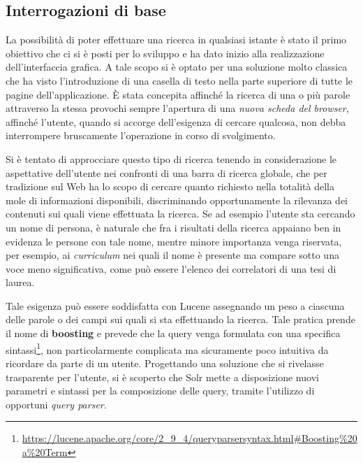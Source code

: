 \subsection{Interrogazioni di base}

La possibilità di poter effettuare una ricerca in qualsiasi istante è stato il primo obiettivo che ci si è posti per lo sviluppo e ha dato inizio alla realizzazione dell’interfaccia grafica. A tale scopo si è optato per una soluzione molto classica che ha visto l’introduzione di una casella di testo nella parte superiore di tutte le pagine dell’applicazione. È stata concepita affinché la ricerca di una o più parole attraverso la stessa provochi sempre l’apertura di una \textit{nuova scheda del browser}, affinché l’utente, quando si accorge dell’esigenza di cercare qualcosa, non debba interrompere bruscamente l’operazione in corso di svolgimento.

\vspace{1em}

Si è tentato di approcciare questo tipo di ricerca tenendo in considerazione le aspettative dell’utente nei confronti di una barra di ricerca globale, che per tradizione sul Web ha lo scopo di cercare quanto richiesto nella totalità della mole di informazioni disponibili, discriminando opportunamente la rilevanza dei contenuti sui quali viene effettuata la ricerca. Se ad esempio l’utente sta cercando un nome di persona, è naturale che fra i risultati della ricerca appaiano ben in evidenza le persone con tale nome, mentre minore importanza venga riservata, per esempio, ai \textit{curriculum} nei quali il nome è presente ma compare sotto una voce meno significativa, come può essere l’elenco dei correlatori di una tesi di laurea.

Tale esigenza può essere soddisfatta con Lucene assegnando un peso a ciascuna delle parole o dei campi sui quali si sta effettuando la ricerca. Tale pratica prende il nome di \textbf{boosting} e prevede che la query venga formulata con una specifica sintassi\footnote{\url{https://lucene.apache.org/core/2\_9\_4/queryparsersyntax.html\#Boosting\%20a\%20Term}}, non particolarmente complicata ma sicuramente poco intuitiva da ricordare da parte di un utente. Progettando una soluzione che si rivelasse trasparente per l’utente, si è scoperto che Solr mette a disposizione nuovi parametri e sintassi per la composizione delle query, tramite l’utilizzo di opportuni \textit{query parser}.


